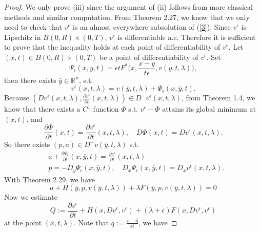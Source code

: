 \documentclass[preprint]{elsarticle}
\numberwithin{equation}{section}
\begin{document}
\begin{proof}
    We only prove (iii) since the argument of (ii) follows from more classical methods and similar computation. From \cite{HT} Theorem 2.27, we know that we only need to check that $v^{\epsilon}$ is an almost everywhere subsolution of (\ref{3}). Since $v^{\epsilon}$ is Lipschitz in $B(0,R) \times (0,T)$, $v^{\epsilon}$ is differentiable a.e. Therefore it is sufficient to prove that the inequality holds at each point of differentiability of $v^{\epsilon}$. Let $(x,t) \in B(0,R) \times (0,T)$ be a point of differentiability of $v^{\epsilon}$. Set 
    \begin{equation}
        \Psi _{\epsilon}(x,y,t)=\epsilon tF^*\big(x,\frac{x-y}{t\epsilon},v(y,t,\lambda)\big),
    \end{equation}
    then there exists $\bar y \in \mathbb R^n$, s.t.
    \begin{equation}
        v^{\epsilon}(x,t,\lambda)=v(\bar y,t,\lambda)+\Psi_{\epsilon}(x,\bar y,t).
    \end{equation}
    Because $(Dv^{\epsilon}(x,t,\lambda),\frac{\partial v^{\epsilon}}{\partial t}(x,t,\lambda)) \in D^-v^{\epsilon}(x,t,\lambda)$, from \cite{HT} Theorem 1.4, we know that there exists a $C^1$ function $\Phi$ s.t. $v^{\epsilon}- \Phi$ attains its global minimum at $(x,t)$, and 
    \begin{equation}
        \frac{\partial \Phi}{\partial t}(x,t)=\frac{\partial v^{\epsilon}}{\partial t}(x,t,\lambda), \quad D\Phi(x,t)=Dv^{\epsilon}(x,t,\lambda).
    \end{equation}
    So there exists $(p,a)\in D^-v(\bar y,t,\lambda)$ s.t.
    \begin{align}
        & a+\frac{\partial \Psi _{\epsilon}}{\partial t}(x,\bar y,t)=\frac{\partial v^{\epsilon}}{\partial t}(x,t,\lambda) \\
        &p=-D_y \Psi _{\epsilon}(x,\bar y,t), \quad D_x \Psi _{\epsilon}(x,\bar y,t)=D_x v^{\epsilon}(x,t,\lambda).
    \end{align}
    With \cite{HT} Theorem 2.29, we have
    \begin{equation}
        a+H(\bar y,p,v(\bar y,t,\lambda))+\lambda F(\bar y,p,v(\bar y,t,\lambda))=0
    \end{equation}
    Now we estimate
    \begin{equation}
        Q:=\frac{\partial v^{\epsilon}}{\partial t} +H(x,Dv^{\epsilon},v^{\epsilon})+(\lambda +\epsilon)F(x,Dv^{\epsilon},v^{\epsilon})
    \end{equation}
    at the point $(x,t,\lambda)$. Note that $q:=\frac{x-\bar y}{\epsilon t}$, we have

\end{proof}
\end{document}
